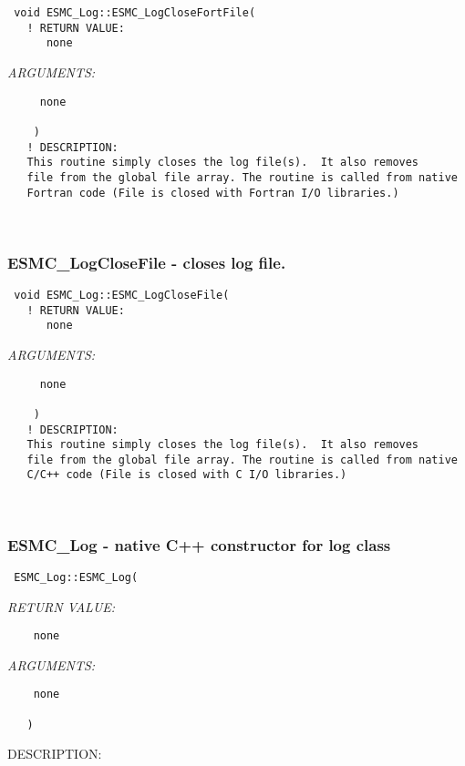   
\begin{verbatim} void ESMC_Log::ESMC_LogCloseFortFile(
   ! RETURN VALUE:
      none\end{verbatim}{\em ARGUMENTS:}
\begin{verbatim}     none
 
    )
   ! DESCRIPTION:
   This routine simply closes the log file(s).  It also removes
   file from the global file array. The routine is called from native
   Fortran code (File is closed with Fortran I/O libraries.)\end{verbatim}
 
 
\mbox{}\hrulefill\ 
 
\subsubsection [ESMC\_LogCloseFile] {ESMC\_LogCloseFile - closes log file. }


  
\begin{verbatim} void ESMC_Log::ESMC_LogCloseFile(
   ! RETURN VALUE:
      none\end{verbatim}{\em ARGUMENTS:}
\begin{verbatim}     none
 
    )
   ! DESCRIPTION:
   This routine simply closes the log file(s).  It also removes
   file from the global file array. The routine is called from native
   C/C++ code (File is closed with C I/O libraries.)\end{verbatim}
 
 
\mbox{}\hrulefill\ 
 
\subsubsection [ESMC\_Log] {ESMC\_Log - native C++ constructor for log class}


  
\begin{verbatim} 
 ESMC_Log::ESMC_Log(
 \end{verbatim}{\em RETURN VALUE:}
\begin{verbatim}    none\end{verbatim}{\em ARGUMENTS:}
\begin{verbatim}    none
 
   )
 \end{verbatim}
{\sf DESCRIPTION:\\ }


